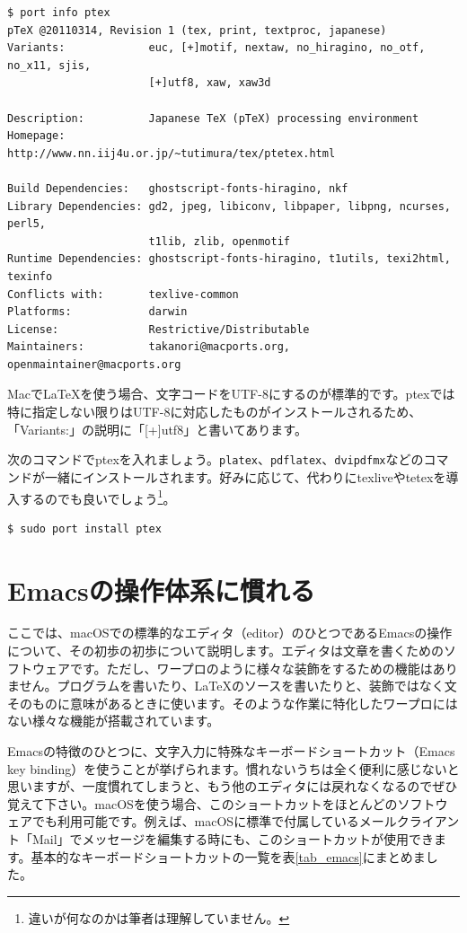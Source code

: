 \begin{lstlisting}
$ port info ptex   
pTeX @20110314, Revision 1 (tex, print, textproc, japanese)
Variants:             euc, [+]motif, nextaw, no_hiragino, no_otf, no_x11, sjis,
                      [+]utf8, xaw, xaw3d

Description:          Japanese TeX (pTeX) processing environment
Homepage:             http://www.nn.iij4u.or.jp/~tutimura/tex/ptetex.html

Build Dependencies:   ghostscript-fonts-hiragino, nkf
Library Dependencies: gd2, jpeg, libiconv, libpaper, libpng, ncurses, perl5,
                      t1lib, zlib, openmotif
Runtime Dependencies: ghostscript-fonts-hiragino, t1utils, texi2html, texinfo
Conflicts with:       texlive-common
Platforms:            darwin
License:              Restrictive/Distributable
Maintainers:          takanori@macports.org, openmaintainer@macports.org
\end{lstlisting}

Macで\LaTeX{}を使う場合、文字コードをUTF-8にするのが標準的です。ptexでは特に指定しない限りはUTF-8に対応したものがインストールされるため、「Variants:」の説明に「[+]utf8」と書いてあります。

次のコマンドでptexを入れましょう。\texttt{platex}、\texttt{pdflatex}、\texttt{dvipdfmx}などのコマンドが一緒にインストールされます。好みに応じて、代わりにtexliveやtetexを導入するのでも良いでしょう\footnote{違いが何なのかは筆者は理解していません。}。

\begin{lstlisting}[language=bash]
$ sudo port install ptex
\end{lstlisting}

\section{Emacsの操作体系に慣れる}
\label{sec:Emacs}

ここでは、macOSでの標準的なエディタ（editor）のひとつであるEmacsの操作について、その初歩の初歩について説明します。エディタは文章を書くためのソフトウェアです。ただし、ワープロのように様々な装飾をするための機能はありません。プログラムを書いたり、\LaTeX{}のソースを書いたりと、装飾ではなく文そのものに意味があるときに使います。そのような作業に特化したワープロにはない様々な機能が搭載されています。

Emacsの特徴のひとつに、文字入力に特殊なキーボードショートカット（Emacs key binding）を使うことが挙げられます。慣れないうちは全く便利に感じないと思いますが、一度慣れてしまうと、もう他のエディタには戻れなくなるのでぜひ覚えて下さい。macOSを使う場合、このショートカットをほとんどのソフトウェアでも利用可能です。例えば、macOSに標準で付属しているメールクライアント「Mail」でメッセージを編集する時にも、このショートカットが使用できます。基本的なキーボードショートカットの一覧を表\ref{tab_emacs}にまとめました。

